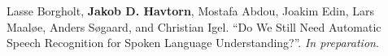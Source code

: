 \begin{enumerate}[leftmargin=8mm,topsep=0mm,label={[\Alph*]}]
    \setcounter{enumi}{2}

    \item {}

    \item {}

    \item {}

    \item {}

    \item Lasse Borgholt, \textbf{Jakob D. Havtorn}, Mostafa Abdou, Joakim Edin, Lars Maaløe, Anders Søgaard, and Christian Igel. “Do We Still Need Automatic Speech Recognition for Spoken Language Understanding?”. \textit{In preparation}.

\end{enumerate}

\raggedright

\vspace*{\fill}
